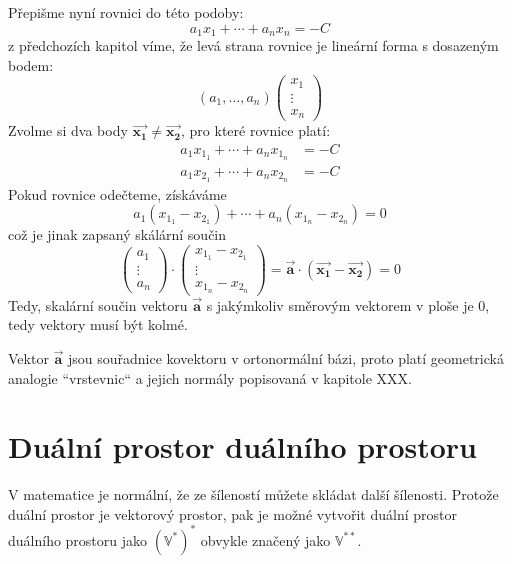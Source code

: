 \documentclass[a5paper,12pt]{amsbook}
\theoremstyle{definition}
\newcommand{\mycoord}[1]{\overrightarrow{\mathbf{#1}}}
\newcommand{\myspace}[1]{\mathbb{#1}}
\newcommand{\mydual}[1]{\myspace{#1^{*}}}
\newcommand{\mydouble}[1]{\myspace{#1^{**}}}
\begin{document}
Přepišme nyní rovnici do této podoby:
\begin{equation*}
a_1x_1 + \cdots + a_nx_n = -C
\end{equation*}
z předchozích kapitol víme, že levá strana rovnice je lineární forma s dosazeným bodem:
\begin{equation*}
\left(a_1, \ldots, a_n\right)\left(\begin{array}{c}x_1 \\ \vdots \\ x_n\end{array}\right)
\end{equation*}
Zvolme si dva body $\mycoord{x_1} \neq \mycoord{x_2}$, pro které rovnice platí:
\begin{equation*}
\begin{split}
a_1x_{1_1} + \cdots + a_nx_{1_n} &= -C \\
a_1x_{2_1} + \cdots + a_nx_{2_n} &= -C
\end{split}
\end{equation*}
Pokud rovnice odečteme, získáváme
\begin{equation*}
a_1(x_{1_1} - x_{2_1}) + \cdots + a_n(x_{1_n} - x_{2_n}) = 0
\end{equation*}
což je jinak zapsaný skálární součin
\begin{equation*}
\left(\begin{array}{c}a_1 \\ \vdots \\ a_n\end{array}\right)\cdot\left(\begin{array}{c}x_{1_1}-x_{2_1} \\
  \vdots \\ x_{1_n} - x_{2_n}\end{array}\right) = \mycoord{a} \cdot (\mycoord{x_1} - \mycoord{x_2}) = 0
\end{equation*}
Tedy, skalární součin vektoru $\mycoord{a}$ s jakýmkoliv směrovým vektorem v ploše je 0, tedy vektory
musí být kolmé.

Vektor $\mycoord{a}$ jsou souřadnice kovektoru v ortonormální bázi, proto platí geometrická analogie
``vrstevnic`` a jejich normály popisovaná v kapitole XXX.

\section{Duální prostor duálního prostoru}

\noindent V matematice je normální, že ze šíleností můžete skládat další šílenosti. Protože duální
prostor je vektorový prostor, pak je možné vytvořit duální prostor duálního prostoru jako
$\mydual{(\mydual{V})}$ obvykle značený jako $\mydouble{V}$.
\end{document}
